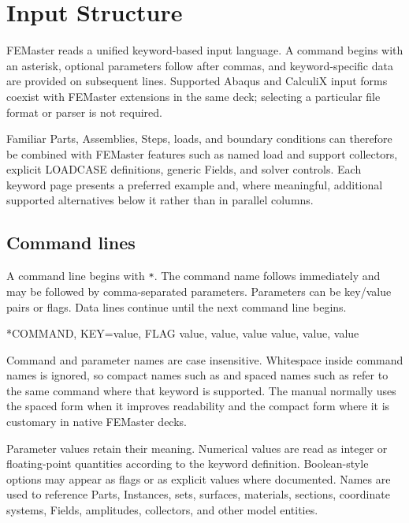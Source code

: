\section{Input Structure}
\label{sec:input-format}

FEMaster reads a unified keyword-based input language. A command
begins with an asterisk, optional parameters follow after commas,
and keyword-specific data are provided on subsequent lines.
Supported Abaqus and CalculiX input forms coexist with FEMaster
extensions in the same deck; selecting a particular file format
or parser is not required.

Familiar Parts, Assemblies, Steps, loads, and boundary conditions
can therefore be combined with FEMaster features such as named
load and support collectors, explicit LOADCASE definitions,
generic Fields, and solver controls. Each keyword page presents
a preferred example and, where meaningful, additional supported
alternatives below it rather than in parallel columns.

\subsection{Command lines}

A command line begins with \texttt{*}. The command name follows immediately and may be followed by comma-separated parameters. Parameters can be key/value pairs or flags. Data lines continue until the next command line begins.

\begin{syntax}
*COMMAND, KEY=value, FLAG
value, value, value
value, value, value
\end{syntax}

Command and parameter names are case insensitive. Whitespace inside command names is ignored, so compact names such as  and spaced names such as  refer to the same command where that keyword is supported. The manual normally uses the spaced form when it improves readability and the compact form where it is customary in native FEMaster decks.

Parameter values retain their meaning. Numerical values are read as integer or floating-point quantities according to the keyword definition. Boolean-style options may appear as flags or as explicit values where documented. Names are used to reference Parts, Instances, sets, surfaces, materials, sections, coordinate systems, Fields, amplitudes, collectors, and other model entities.

